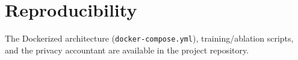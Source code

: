 \documentclass[conference]{IEEEtran}
\begin{document}
\section*{Reproducibility}
The Dockerized architecture (\texttt{docker-compose.yml}), training/ablation
scripts, and the privacy accountant are available in the project repository.



\end{document}
